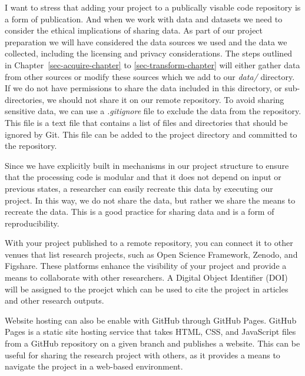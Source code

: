 \documentclass[
  letterpaper,
]{latex/krantz}
\theoremstyle{definition}
\theoremstyle{remark}
\begin{document}
I want to stress that adding your project to a publically visable code
repository is a form of publication. And when we work with data and
datasets we need to consider the ethical implications of sharing data.
As part of our project preparation we will have considered the data
sources we used and the data we collected, including the licensing and
privacy considerations. The steps outlined in
Chapter~\ref{sec-acquire-chapter} to \ref{sec-transform-chapter} will
either gather data from other sources or modify these sources which we
add to our \emph{data/} directory. If we do not have permissions to
share the data included in this directory, or sub-directories, we should
not share it on our remote repository. To avoid sharing sensitive data,
we can use a \emph{.gitignore} file to exclude the data from the
repository. This file is a text file that contains a list of files and
directories that should be ignored by Git. This file can be added to the
project directory and committed to the repository.

Since we have explicitly built in mechanisms in our project structure to
ensure that the processing code is modular and that it does not depend
on input or previous states, a researcher can easily recreate this data
by executing our project. In this way, we do not share the data, but
rather we share the means to recreate the data. This is a good practice
for sharing data and is a form of reproducibility.

With your project published to a remote repository, you can connect it
to other venues that list research projects, such as Open Science
Framework, Zenodo, and Figshare. These platforms enhance the visibility
of your project and provide a means to collaborate with other
researchers. A Digital Object Identifier (DOI) will be assigned to the
proejct which can be used to cite the project in articles and other
research outputs.

Website hosting can also be enable with GitHub through GitHub Pages.
GitHub Pages is a static site hosting service that takes HTML, CSS, and
JavaScript files from a GitHub repository on a given branch and
publishes a website. This can be useful for sharing the research project
with others, as it provides a means to navigate the project in a
web-based environment.
\end{document}
